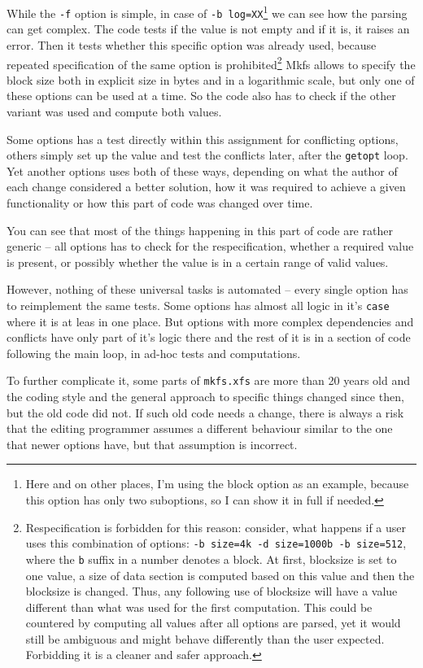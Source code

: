 While the {\tt -f} option is simple, in case of {\tt -b
log=XX}\footnote{Here and on other places, I'm using the block option as an
example, because this option has only two suboptions, so I can show it in
full if needed.} we can see how the parsing can get complex. The code tests
if the value is not empty and if it is, it raises an error. Then it tests
whether this specific option was already used, because repeated
specification of the same option is prohibited\footnote{Respecification is
	forbidden for this reason: consider, what happens if a user uses
	this combination of options: {\tt  -b size=4k -d size=1000b -b
	size=512}, where the {\tt b} suffix in a number denotes a block. At
	first, blocksize is set to one value, a size of data section is
	computed based on this value and then the blocksize is changed.
	Thus, any following use of blocksize will have a value different
	than what was used for the first computation. This could be
	countered by computing all values after all options are parsed, yet
	it would still be ambiguous and might behave differently than the
	user expected. Forbidding it is a cleaner and safer approach.} Mkfs
	allows to specify the block size both in explicit size in bytes and
	in a logarithmic scale, but only one of these options can be used
	at a time. So the code also has to check if the other variant was
	used and compute both values.

Some options has a test directly within this assignment for conflicting
options, others simply set up the value and test the conflicts later, after
the {\tt getopt} loop. Yet another options uses both of these ways, depending on what the author of
each change considered a better solution, how it was required to achieve a given
functionality or how this part of code was changed over time.

You can see that most of the things happening in this part of code are
rather generic -- all options has to check for the respecification, whether
a required value is present, or possibly whether the value is in a certain
range of valid values.

However, nothing of these universal tasks is automated -- every single
option has to reimplement the same tests. Some options has almost all logic
in it's {\tt case} where it is at leas in one place. But options with more
complex dependencies and conflicts have only part of it's logic there and
the rest of it is in a section of code following the main loop, in ad-hoc
tests and computations.

To further complicate it, some parts of {\tt mkfs.xfs} are more than 20
years old and the coding style and the general approach to specific things
changed since then, but the old code did not. If such old code needs a
change, there is always a risk that the editing programmer assumes a
different behaviour similar to the one that newer options have, but that
assumption is incorrect.

